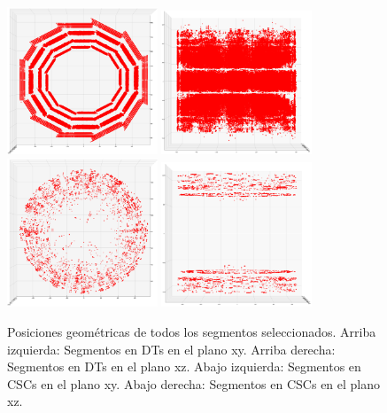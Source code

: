 \begin{figure}
\centering
\includegraphics[width=0.4\textwidth]{figures/Hits_DT_xy_postCleaning.png}
\includegraphics[width=0.4\textwidth]{figures/Hits_DT_xz_boarders.png}
\includegraphics[width=0.4\textwidth]{figures/Hits_CSC_xy_boarders.png}
\includegraphics[width=0.4\textwidth]{figures/Hits_CSC_xz_boarders.png}
\caption{Posiciones geom\'etricas de todos los segmentos seleccionados. Arriba izquierda: Segmentos en DTs en el plano xy. Arriba derecha: Segmentos en DTs en el plano xz. Abajo izquierda: Segmentos en CSCs en el plano xy. Abajo derecha: Segmentos en CSCs en el plano xz.}
\label{fig:segments_pos}
\end{figure}


